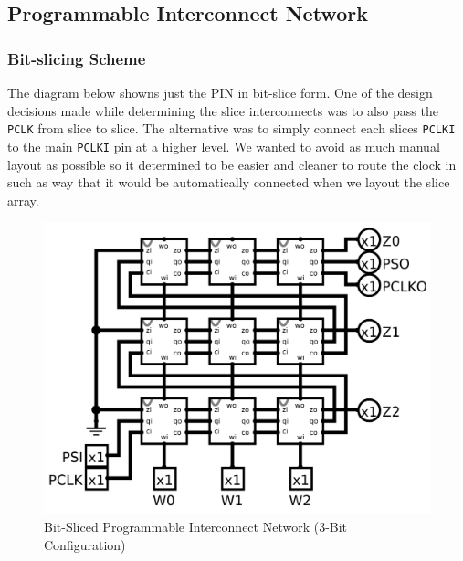     \newpage
    \subsection{Programmable Interconnect Network}

        \subsubsection{Bit-slicing Scheme}
        The diagram below showns just the PIN in bit-slice form. One of the
        design decisions made while determining the slice interconnects was to
        also pass the \texttt{PCLK} from slice to slice. The alternative was to
        simply connect each slices \texttt{PCLKI} to the main \texttt{PCLKI}
        pin at a higher level. We wanted to avoid as much manual layout as
        possible so it determined to be easier and cleaner to route the clock
        in such as way that it would be automatically connected when we layout
        the slice array.
        \begin{figure}[H]
            \centering
            \includegraphics[width=0.5\linewidth]{../../logisim/pin.png}
            \caption{Bit-Sliced Programmable Interconnect Network (3-Bit Configuration)}
        \end{figure}

